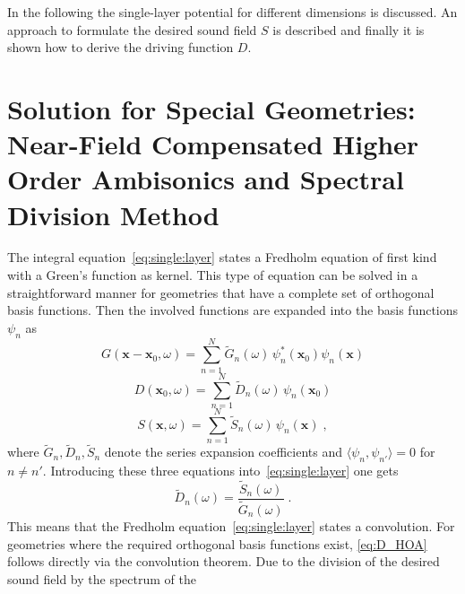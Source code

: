 \documentclass[a4paper]{book}
\renewcommand{\vec}[1]{\mathbf{#1}}                  %
\newcommand{\x}{\vec{x}}                             %
\newcommand{\qc}{\;,}                                             %
\newcommand{\qp}{\;.}                                             %
\begin{document}
In the following the single-layer potential for different
dimensions is discussed. An approach
to formulate the desired sound field $S$ is described and finally it is
shown how to derive the driving function $D$.


\section[Near-Field Compensated Higher Order Ambisonics]{Solution for Special
Geometries: Near-Field Compensated Higher Order Ambisonics and Spectral Division Method}
\label{sec:HOA_SDM}

The integral equation~\eqref{eq:single:layer} states a Fredholm
equation of first kind with a Green's function as kernel. This type of equation
can be solved in a straightforward manner for geometries that have a complete
set of orthogonal basis functions. Then the involved functions are expanded
into the basis functions $\psi_n$ as\cite[Compare][p.\,940]{Morse1981}
%
\begin{equation}
    G(\x-\x_0,\omega) = \sum_{n=1}^N \tilde{G}_n(\omega) \,
        \psi_n^*(\x_0) \psi_n(\x)
    \label{eq:G_expansion}
\end{equation}
%
\begin{equation}
    D(\x_0,\omega) = \sum_{n=1}^N \tilde{D}_n(\omega) \,
        \psi_n(\x_0)
    \label{eq:D_expansion}
\end{equation}
%
\begin{equation}
    S(\x,\omega) = \sum_{n=1}^N \tilde{S}_n(\omega) \,
        \psi_n(\x) \qc
    \label{eq:S_expansion}
\end{equation}
%
where $\tilde{G}_n, \tilde{D}_n, \tilde{S}_n$ denote the series expansion
coefficients and \linebreak $\langle\psi_n, \psi_{n'}\rangle = 0$ for $n \ne n'$.
Introducing these three equations
into~\eqref{eq:single:layer} one gets
%
\begin{equation}
    \tilde{D}_n(\omega) = \frac{\tilde{S}_n(\omega)}{\tilde{G}_n(\omega)} \qp
    \label{eq:D_HOA}
\end{equation}
%
This means that the Fredholm equation~\eqref{eq:single:layer}
states a convolution. For geometries where
the required orthogonal basis functions exist, \eqref{eq:D_HOA} follows directly via
the convolution theorem.\cite[Compare][p.\,1013]{Arfken2005}
Due to the division of the desired sound field by the spectrum of the
\end{document}
